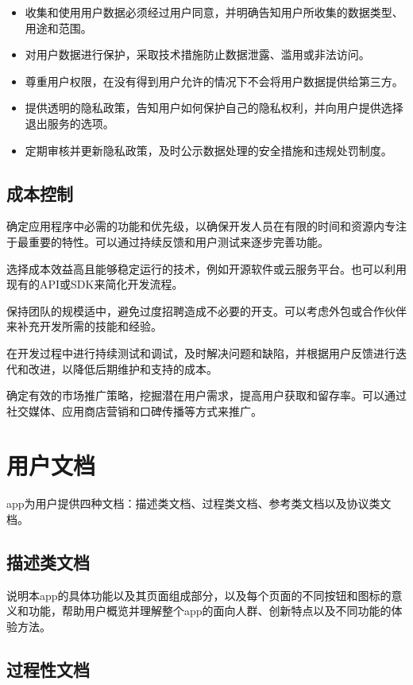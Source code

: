     \begin{itemize}
        \item 收集和使用用户数据必须经过用户同意，并明确告知用户所收集的数据类型、用途和范围。
        \item 对用户数据进行保护，采取技术措施防止数据泄露、滥用或非法访问。
        \item 尊重用户权限，在没有得到用户允许的情况下不会将用户数据提供给第三方。
        \item 提供透明的隐私政策，告知用户如何保护自己的隐私权利，并向用户提供选择退出服务的选项。
        \item 定期审核并更新隐私政策，及时公示数据处理的安全措施和违规处罚制度。
    \end{itemize}

    \subsection{成本控制}

    确定应用程序中必需的功能和优先级，以确保开发人员在有限的时间和资源内专注于最重要的特性。可以通过持续反馈和用户测试来逐步完善功能。
    
    选择成本效益高且能够稳定运行的技术，例如开源软件或云服务平台。也可以利用现有的API或SDK来简化开发流程。
    
    保持团队的规模适中，避免过度招聘造成不必要的开支。可以考虑外包或合作伙伴来补充开发所需的技能和经验。
    
    在开发过程中进行持续测试和调试，及时解决问题和缺陷，并根据用户反馈进行迭代和改进，以降低后期维护和支持的成本。
    
    确定有效的市场推广策略，挖掘潜在用户需求，提高用户获取和留存率。可以通过社交媒体、应用商店营销和口碑传播等方式来推广。

\section{用户文档}

    app为用户提供四种文档：描述类文档、过程类文档、参考类文档以及协议类文档。

    \subsection{描述类文档}
    
        说明本app的具体功能以及其页面组成部分，以及每个页面的不同按钮和图标的意义和功能，帮助用户概览并理解整个app的面向人群、创新特点以及不同功能的体验方法。

    \subsection{过程性文档}
    
